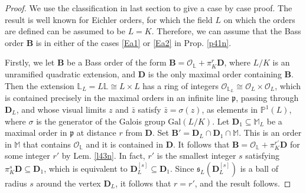 \documentclass[10pt,a4paper]{amsart}
\newcommand\Ba{\mathbf B}
\newcommand\Da{\mathbf{D}}
\newcommand\alge{\mathbb{M}}
\newcommand\lu{\mathbb{L}}
\newcommand\oink{\mathcal O}
\begin{document}
\begin{proof}
We use the classification in last section 
to give a case
by case proof.  The result is well known for 
Eichler orders, for which the field $L$ 
on which the orders
are defined can be assumed to be $L=K$. Therefore,
we can assume that the Bass order $\Ba$ is 
in either of the cases \ref{Ea1} or 
\ref{Ea2} in Prop. \ref{p41n}.

Firstly, we let $\Ba$ be a Bass order of the form
$\Ba=\mathcal{O}_{\lu}+\pi_K^r\Da$,
where $L/K$ is an unramified quadratic extension,
and $\Da$ is the only maximal order containing
$\Ba$. Then the extension 
$\lu_L=L\lu\cong L\times L$
has a ring of integers 
$\oink_{\lu_L}\cong\oink_L\times\oink_L$,
which is contained precisely in the maximal orders 
in an infinite line $\mathfrak{p}$, passing through $\Da_L$, 
and whose visual limits $z$ and $\bar{z}$
satisfy $\bar{z}=\sigma(z)$,
as elements in $\mathbb{P}^1(L)$,
where $\sigma$ is the 
generator of the Galois group $\mathrm{Gal}(L/K)$.  
Let $\Da_1\subseteq\alge_L$ be a 
maximal order in $\mathfrak{p}$ at distance $r$ from $\Da$. Set 
$\Ba'=\Da_L\cap\Da_1\cap\alge $. 
This is an order in
$\alge $ that contains $\oink_{\lu}$ and 
it is contained
in $\Da$. It follows that 
$\Ba=\mathcal{O}_{\lu}+\pi_K^{r'}\Da$ for 
some integer
$r'$ by Lem. \ref{l43n}. In fact, $r'$ is the smallest integer $s$ satisfying
$\pi_K^s\Da\subseteq\Da_1$, which is equivalent
to $\Da_L^{[s]}\subseteq\Da_1$. Since 
$\mathfrak{s}_L\left(\Da_L^{[s]}\right)$ is a ball of radius $s$
around the vertex $\Da_L$, it follows that $r=r'$, 
and the result follows.


\end{proof}
\end{document}
